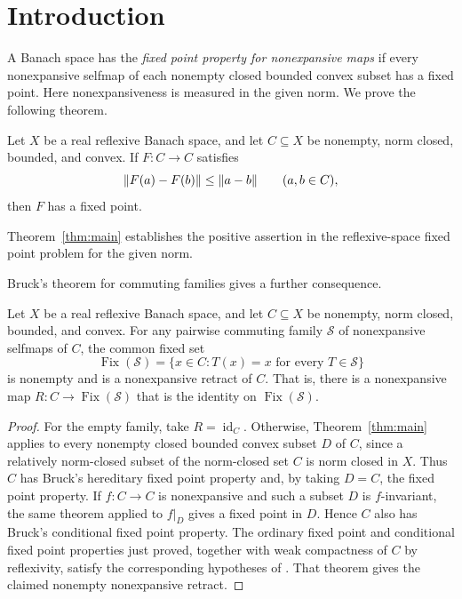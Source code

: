 \section{Introduction}
\label{sec:introduction}

A Banach space has the \emph{fixed point property for nonexpansive maps}
if every nonexpansive selfmap of each nonempty closed bounded convex
subset has a fixed point. Here nonexpansiveness is measured in the given
norm. We prove the following theorem.

\begin{theorem}\label{thm:main}
Let $X$ be a real reflexive Banach space, and let $C\subseteq X$ be
nonempty, norm closed, bounded, and convex. If $F:C\to C$ satisfies
\[
  \lVert F(a)-F(b)\rVert\le \lVert a-b\rVert\qquad(a,b\in C),
\]
then $F$ has a fixed point.
\end{theorem}

Theorem~\ref{thm:main} establishes the positive assertion in the
reflexive-space fixed point problem for the given norm.

Bruck's theorem for commuting families gives a further consequence.

\begin{corollary}\label{cor:commuting}
Let $X$ be a real reflexive Banach space, and let $C\subseteq X$ be
nonempty, norm closed, bounded, and convex. For any pairwise commuting
family $\mathcal S$ of nonexpansive selfmaps of $C$, the common fixed set
\[
  \operatorname{Fix}(\mathcal S)
  =\{x\in C:T(x)=x\text{ for every }T\in\mathcal S\}
\]
is nonempty and is a nonexpansive retract of $C$. That is, there is a
nonexpansive map $R:C\to\operatorname{Fix}(\mathcal S)$ that is the
identity on $\operatorname{Fix}(\mathcal S)$.
\end{corollary}

\begin{proof}
For the empty family, take $R=\operatorname{id}_C$. Otherwise,
Theorem~\ref{thm:main} applies to every nonempty closed bounded convex
subset $D$ of $C$, since a relatively norm-closed subset of the
norm-closed set $C$ is norm closed in $X$. Thus $C$
has Bruck's hereditary fixed point property and, by taking $D=C$, the
fixed point property. If $f:C\to C$ is nonexpansive and such a subset
$D$ is $f$-invariant, the same theorem applied to $f|_D$ gives a fixed
point in $D$. Hence $C$ also has Bruck's conditional fixed point
property. The ordinary fixed point and conditional fixed point properties
just proved, together with weak compactness of $C$ by reflexivity, satisfy
the corresponding hypotheses of \citet[Theorem~1]{Bruck1974}. That theorem
gives the claimed nonempty nonexpansive retract.
\end{proof}

